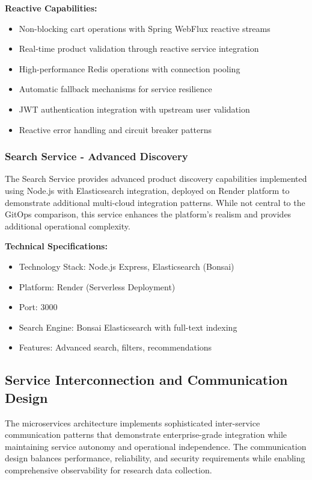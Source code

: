 \textbf{Reactive Capabilities:}
\begin{itemize}
\item Non-blocking cart operations with Spring WebFlux reactive streams
\item Real-time product validation through reactive service integration
\item High-performance Redis operations with connection pooling
\item Automatic fallback mechanisms for service resilience
\item JWT authentication integration with upstream user validation
\item Reactive error handling and circuit breaker patterns
\end{itemize}

\subsubsection{Search Service - Advanced Discovery}

The Search Service provides advanced product discovery capabilities implemented using Node.js with Elasticsearch integration, deployed on Render platform to demonstrate additional multi-cloud integration patterns. While not central to the GitOps comparison, this service enhances the platform's realism and provides additional operational complexity.

\textbf{Technical Specifications:}
\begin{itemize}
\item Technology Stack: Node.js Express, Elasticsearch (Bonsai)
\item Platform: Render (Serverless Deployment)
\item Port: 3000
\item Search Engine: Bonsai Elasticsearch with full-text indexing
\item Features: Advanced search, filters, recommendations
\end{itemize}

\subsection{Service Interconnection and Communication Design}

The microservices architecture implements sophisticated inter-service communication patterns that demonstrate enterprise-grade integration while maintaining service autonomy and operational independence. The communication design balances performance, reliability, and security requirements while enabling comprehensive observability for research data collection.


